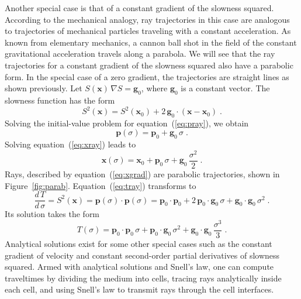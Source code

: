 \documentclass[12pt]{handout}
\begin{document}

Another special case is that of a constant gradient of the slowness squared.
According to the mechanical analogy, ray trajectories in this case are
analogous to trajectories of mechanical particles traveling with a constant
acceleration. As known from elementary mechanics, a cannon ball shot in the
field of the constant gravitational acceleration travels along a parabola. We
will see that the ray trajectories for a constant gradient of the slowness
squared also have a parabolic form. In the special case of a zero gradient,
the trajectories are straight lines as shown previously. Let
$S(\mathbf{x})\,\nabla S = \mathbf{g}_0$, where $\mathbf{g}_0$ is a constant
vector. The slowness function has the form
\begin{equation}
  \label{eq:grad}
  S^2(\mathbf{x}) = S^2(\mathbf{x}_0) + 
  2\,\mathbf{g}_0 \cdot (\mathbf{x}-\mathbf{x}_0)\;.
\end{equation}
Solving the initial-value problem for equation~(\ref{eq:pray}), we obtain
\begin{equation}
  \label{eq:pgrad}
  \mathbf{p}(\sigma) =  \mathbf{p}_0 + \mathbf{g}_0\,\sigma\;.
\end{equation}
Solving equation~(\ref{eq:xray}) leads to
\begin{equation}
  \label{eq:xgrad}
  \mathbf{x}(\sigma) = \mathbf{x}_0 + \mathbf{p}_0\,\sigma
  + \mathbf{g}_0\,\frac{\sigma^2}{2}\;.
\end{equation}
Rays, described by equation~(\ref{eq:xgrad}) are parabolic trajectories, shown
in Figure~\ref{fig:parab}.  Equation~(\ref{eq:tray}) transforms to
\begin{equation}
  \label{eq:tgrad0}
  \frac{d\,T}{d\,\sigma} = S^2(\mathbf{x}) = 
  \mathbf{p}(\sigma) \cdot \mathbf{p}(\sigma) =
  \mathbf{p}_0 \cdot \mathbf{p}_0 + 2\,\mathbf{p}_0 \cdot \mathbf{g}_0\,\sigma
  +  \mathbf{g}_0 \cdot \mathbf{g}_0\,\sigma^2\;.
\end{equation}
Its solution takes the form
\begin{equation}
  \label{eq:tgrad}
  T(\sigma) = \mathbf{p}_0 \cdot \mathbf{p}_0\,\sigma +
  \mathbf{p}_0 \cdot \mathbf{g}_0\,\sigma^2 +  
  \mathbf{g}_0 \cdot \mathbf{g}_0\,\frac{\sigma^3}{3}\;.
\end{equation}
Analytical solutions exist for some other special cases such as the
constant gradient of velocity and constant second-order partial
derivatives of slowness squared. Armed with analytical solutions and
Snell's law, one can compute traveltimes by dividing the medium into
cells, tracing rays analytically inside each cell, and using Snell's
law to transmit rays through the cell interfaces.
\end{document}
